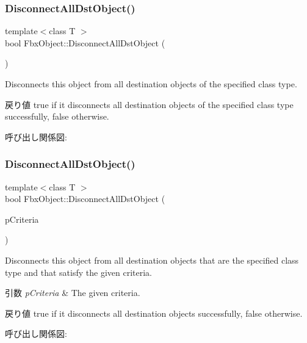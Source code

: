 \subsubsection{\texorpdfstring{Disconnect\+All\+Dst\+Object()}{DisconnectAllDstObject()}\hspace{0.1cm}{\footnotesize\ttfamily [3/4]}}
{\footnotesize\ttfamily template$<$class T $>$ \\
bool Fbx\+Object\+::\+Disconnect\+All\+Dst\+Object (\begin{DoxyParamCaption}{ }\end{DoxyParamCaption})}

Disconnects this object from all destination objects of the specified class type. \begin{DoxyReturn}{戻り値}
{\ttfamily true} if it disconnects all destination objects of the specified class type successfully, {\ttfamily false} otherwise. 
\end{DoxyReturn}
呼び出し関係図\+:
\mbox{\label{class_fbx_object_afd459bbb653d2a31e5c03dfdb64e649b}} 
\subsubsection{\texorpdfstring{Disconnect\+All\+Dst\+Object()}{DisconnectAllDstObject()}\hspace{0.1cm}{\footnotesize\ttfamily [4/4]}}
{\footnotesize\ttfamily template$<$class T $>$ \\
bool Fbx\+Object\+::\+Disconnect\+All\+Dst\+Object (\begin{DoxyParamCaption}\item[{const \hyperlink{class_fbx_criteria}{Fbx\+Criteria} \&}]{p\+Criteria }\end{DoxyParamCaption})}

Disconnects this object from all destination objects that are the specified class type and that satisfy the given criteria. 
\begin{DoxyParams}{引数}
{\em p\+Criteria} & The given criteria. \\
\hline
\end{DoxyParams}
\begin{DoxyReturn}{戻り値}
{\ttfamily true} if it disconnects all destination objects successfully, {\ttfamily false} otherwise. 
\end{DoxyReturn}
呼び出し関係図\+:
\mbox{\label{class_fbx_object_af1e035b53794520b66c3240a20660b40}} 

